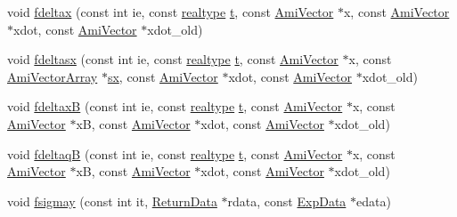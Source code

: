 \begin{DoxyCompactItemize}
\item 
void \mbox{\hyperlink{classamici_1_1_model_a8e0cb4f4dd677822d0c33117e267f661}{fdeltax}} (const int ie, const \mbox{\hyperlink{namespaceamici_a1bdce28051d6a53868f7ccbf5f2c14a3}{realtype}} \mbox{\hyperlink{classamici_1_1_model_a711281d57e9710226face29151cc4641}{t}}, const \mbox{\hyperlink{classamici_1_1_ami_vector}{Ami\+Vector}} $\ast$x, const \mbox{\hyperlink{classamici_1_1_ami_vector}{Ami\+Vector}} $\ast$xdot, const \mbox{\hyperlink{classamici_1_1_ami_vector}{Ami\+Vector}} $\ast$xdot\+\_\+old)
\item 
void \mbox{\hyperlink{classamici_1_1_model_a685b7374d29d96f7d40d83c7d92fcf27}{fdeltasx}} (const int ie, const \mbox{\hyperlink{namespaceamici_a1bdce28051d6a53868f7ccbf5f2c14a3}{realtype}} \mbox{\hyperlink{classamici_1_1_model_a711281d57e9710226face29151cc4641}{t}}, const \mbox{\hyperlink{classamici_1_1_ami_vector}{Ami\+Vector}} $\ast$x, const \mbox{\hyperlink{classamici_1_1_ami_vector_array}{Ami\+Vector\+Array}} $\ast$\mbox{\hyperlink{classamici_1_1_model_ac3288cc7f649605938f1fd1b459d3d8c}{sx}}, const \mbox{\hyperlink{classamici_1_1_ami_vector}{Ami\+Vector}} $\ast$xdot, const \mbox{\hyperlink{classamici_1_1_ami_vector}{Ami\+Vector}} $\ast$xdot\+\_\+old)
\item 
void \mbox{\hyperlink{classamici_1_1_model_a5542077fa03103e502349d92dc95f33a}{fdeltaxB}} (const int ie, const \mbox{\hyperlink{namespaceamici_a1bdce28051d6a53868f7ccbf5f2c14a3}{realtype}} \mbox{\hyperlink{classamici_1_1_model_a711281d57e9710226face29151cc4641}{t}}, const \mbox{\hyperlink{classamici_1_1_ami_vector}{Ami\+Vector}} $\ast$x, const \mbox{\hyperlink{classamici_1_1_ami_vector}{Ami\+Vector}} $\ast$xB, const \mbox{\hyperlink{classamici_1_1_ami_vector}{Ami\+Vector}} $\ast$xdot, const \mbox{\hyperlink{classamici_1_1_ami_vector}{Ami\+Vector}} $\ast$xdot\+\_\+old)
\item 
void \mbox{\hyperlink{classamici_1_1_model_aef4944ffd8a1b4f9a92ce1f8923af695}{fdeltaqB}} (const int ie, const \mbox{\hyperlink{namespaceamici_a1bdce28051d6a53868f7ccbf5f2c14a3}{realtype}} \mbox{\hyperlink{classamici_1_1_model_a711281d57e9710226face29151cc4641}{t}}, const \mbox{\hyperlink{classamici_1_1_ami_vector}{Ami\+Vector}} $\ast$x, const \mbox{\hyperlink{classamici_1_1_ami_vector}{Ami\+Vector}} $\ast$xB, const \mbox{\hyperlink{classamici_1_1_ami_vector}{Ami\+Vector}} $\ast$xdot, const \mbox{\hyperlink{classamici_1_1_ami_vector}{Ami\+Vector}} $\ast$xdot\+\_\+old)
\item 
void \mbox{\hyperlink{classamici_1_1_model_af729c798cfe341d7bef0ecba62800dd7}{fsigmay}} (const int it, \mbox{\hyperlink{classamici_1_1_return_data}{Return\+Data}} $\ast$rdata, const \mbox{\hyperlink{classamici_1_1_exp_data}{Exp\+Data}} $\ast$edata)

\end{DoxyCompactItemize}
